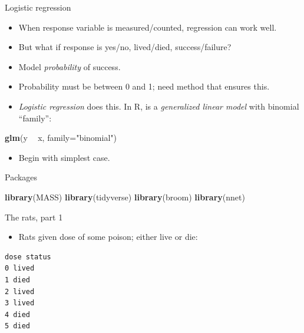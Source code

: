 \documentclass[
  ignorenonframetext,
]{beamer}
\newenvironment{Shaded}{\begin{snugshade}}{\end{snugshade}}
\newcommand{\DataTypeTok}[1]{\textcolor[rgb]{0.13,0.29,0.53}{#1}}
\newcommand{\KeywordTok}[1]{\textcolor[rgb]{0.13,0.29,0.53}{\textbf{#1}}}
\newcommand{\NormalTok}[1]{#1}
\newcommand{\OperatorTok}[1]{\textcolor[rgb]{0.81,0.36,0.00}{\textbf{#1}}}
\newcommand{\StringTok}[1]{\textcolor[rgb]{0.31,0.60,0.02}{#1}}
\providecommand{\tightlist}{%
  \setlength{\itemsep}{0pt}\setlength{\parskip}{0pt}}
\begin{document}
\begin{frame}[fragile]{Logistic regression}
\protect\hypertarget{logistic-regression}{}

\begin{itemize}
\item
  When response variable is measured/counted, regression can work well.
\item
  But what if response is yes/no, lived/died, success/failure?
\item
  Model \emph{probability} of success.
\item
  Probability must be between 0 and 1; need method that ensures this.
\item
  \emph{Logistic regression} does this. In R, is a \emph{generalized
  linear model} with binomial ``family'':
\end{itemize}

\begin{Shaded}
\begin{Highlighting}[]
\KeywordTok{glm}\NormalTok{(y }\OperatorTok{~}\StringTok{ }\NormalTok{x, }\DataTypeTok{family=}\StringTok{"binomial"}\NormalTok{)}
\end{Highlighting}
\end{Shaded}

\begin{itemize}
\tightlist
\item
  Begin with simplest case.
\end{itemize}

\end{frame}

\begin{frame}[fragile]{Packages}
\protect\hypertarget{packages-1}{}

\begin{Shaded}
\begin{Highlighting}[]
\KeywordTok{library}\NormalTok{(MASS)}
\KeywordTok{library}\NormalTok{(tidyverse)}
\KeywordTok{library}\NormalTok{(broom)}
\KeywordTok{library}\NormalTok{(nnet)}
\end{Highlighting}
\end{Shaded}

\end{frame}

\begin{frame}[fragile]{The rats, part 1}
\protect\hypertarget{the-rats-part-1}{}

\begin{itemize}
\tightlist
\item
  Rats given dose of some poison; either live or die:
\end{itemize}

\small

\begin{verbatim}
dose status
0 lived
1 died
2 lived
3 lived
4 died
5 died
\end{verbatim}

\normalsize

\end{frame}
\end{document}
